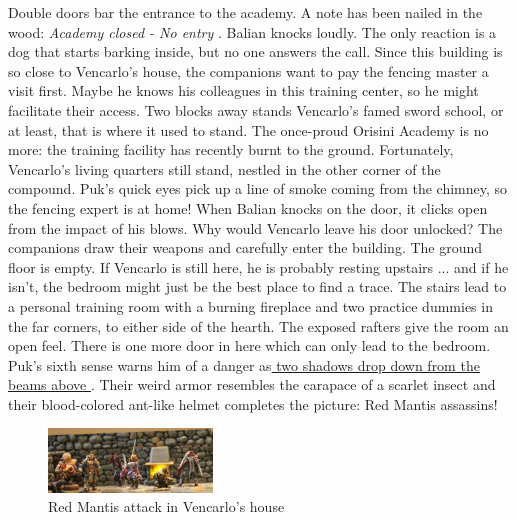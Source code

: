 Double doors bar the entrance to the academy. A note has been nailed in the wood: {\itshape Academy closed - No entry} . Balian knocks loudly. The only reaction is a dog that starts barking inside, but no one answers the call. Since this building is so close to Vencarlo's house, the companions want to pay the fencing master a visit first. Maybe he knows his colleagues in this training center, so he might facilitate their access. Two blocks away stands Vencarlo's famed sword school, or at least, that is where it used to stand. The once-proud Orisini Academy is no more: the training facility has recently burnt to the ground. Fortunately, Vencarlo's living quarters still stand, nestled in the other corner of the compound. Puk's quick eyes pick up a line of smoke coming from the chimney, so the fencing expert is at home! When Balian knocks on the door, it clicks open from the impact of his blows. Why would Vencarlo leave his door unlocked? The companions draw their weapons and carefully enter the building. The ground floor is empty. If Vencarlo is still here, he is probably resting upstairs ... and if he isn't, the bedroom might just be the best place to find a trace. The stairs lead to a personal training room with a burning fireplace and two practice dummies in the far corners, to either side of the hearth. The exposed rafters give the room an open feel. There is one more door in here which can only lead to the bedroom. Puk's sixth sense warns him of a danger as\hyperref[fig:Red-Mantis-attack-in-Vencarlo-s-house-548844795 ]{ two shadows drop down from the beams above } . Their weird armor resembles the carapace of a scarlet insect and their blood-colored ant-like helmet completes the picture: Red Mantis assassins! \\

\begin{figure}[h]
	\centering
	\includegraphics[width=0.39\textwidth]{images/Red-Mantis-attack-in-Vencarlo-s-house-548844795 .jpg}
	\caption{Red Mantis attack in Vencarlo's house}
	\label{fig:Red-Mantis-attack-in-Vencarlo-s-house-548844795 }
\end{figure}

